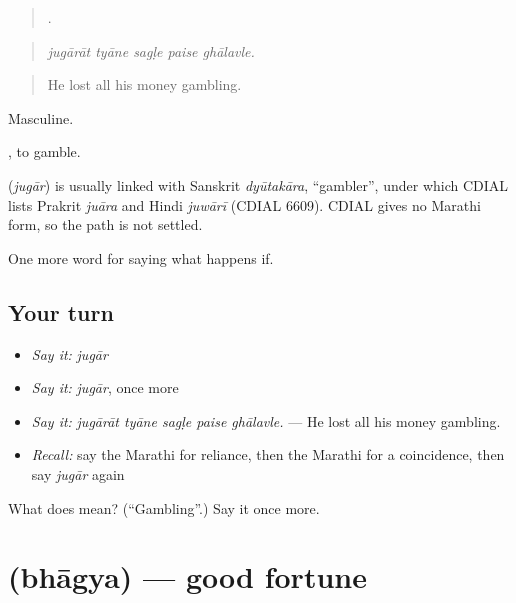 \begin{quote}
    .
\end{quote}

\begin{quote}
\emph{jugārāt tyāne sagḷe paise ghālavle.}
\end{quote}

\begin{quote}
He lost all his money gambling.
\end{quote}

Masculine.

 , to gamble.

\begin{cousinweb}
\textbf{} (\emph{jugār}) is usually linked with Sanskrit \emph{dyūtakāra}, \textquotedblleft{}gambler\textquotedblright{}, under which CDIAL lists Prakrit \emph{juāra} and Hindi \emph{juwārī} (CDIAL 6609). CDIAL gives no Marathi form, so the path is not settled.
\end{cousinweb}

\begin{grammarlens}[title={What you've built}]
One more word for saying what happens if.
\end{grammarlens}

\subsection*{Your turn}
\begin{itemize}
\raggedright
  \item \emph{Say it:} \emph{jugār}
  \item \emph{Say it:} \emph{jugār}, once more
  \item \emph{Say it:} \emph{jugārāt tyāne sagḷe paise ghālavle.} — He lost all his money gambling.
  \item \emph{Recall:} say the Marathi for reliance, then the Marathi for a coincidence, then say \emph{jugār} again
\end{itemize}

\begin{tcolorbox}[breakable,colback=teal!4,colframe=teal!35!black,title={Before you move on}]
What does  mean? (\textquotedblleft{}Gambling\textquotedblright{}.) Say it once more.
\end{tcolorbox}
\section[\texorpdfstring{\mr{भाग्य} (bhāgya)}{भाग्य (bhāgya)}]{ (bhāgya) — good fortune}

